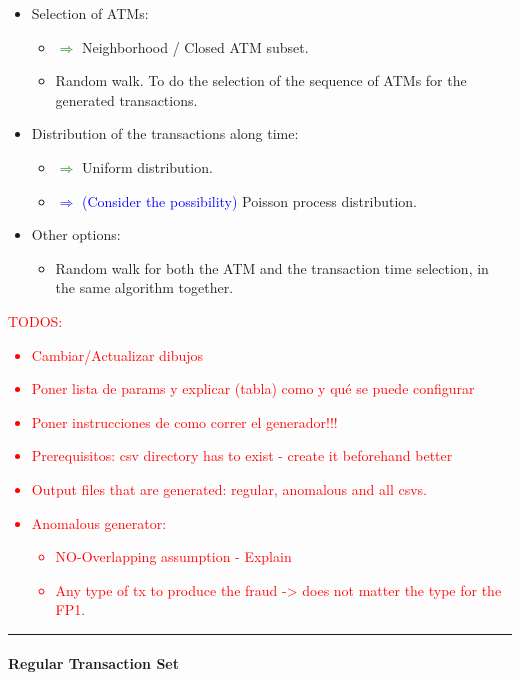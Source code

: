 \begin{itemize}
  \item Selection of ATMs:
  \begin{itemize}
    \item \textcolor{green}{$\Rightarrow$} Neighborhood / Closed ATM subset.
    \item Random walk. To do the selection of the sequence of ATMs for the generated transactions.
  \end{itemize}
  \item Distribution of the transactions along time:
  \begin{itemize}
    \item \textcolor{green}{$\Rightarrow$} Uniform distribution.
    \item \textcolor{blue}{$\Rightarrow$ (Consider the possibility)} Poisson process distribution.
  \end{itemize}
  \item Other options:
  \begin{itemize}
    \item Random walk for both the ATM and the transaction time selection, in the same algorithm together.
  \end{itemize}
\end{itemize}

\textcolor{red}{TODOS:
\begin{itemize}
\item Cambiar/Actualizar dibujos
\item Poner lista de params y explicar (tabla) como y qué se puede configurar
\item Poner instrucciones de como correr el generador!!!
\item Prerequisitos: csv directory has to exist - create it beforehand better
\item Output files that are generated: regular, anomalous and all csvs.
\item Anomalous generator:
\begin{itemize}
  \item NO-Overlapping assumption - Explain
  \item Any type of tx to produce the fraud -> does not matter the type for the FP1.
\end{itemize}
\end{itemize}
}

\textcolor{red}{\rule{\linewidth}{0.5mm}}

\paragraph{Regular Transaction Set\\\\}


